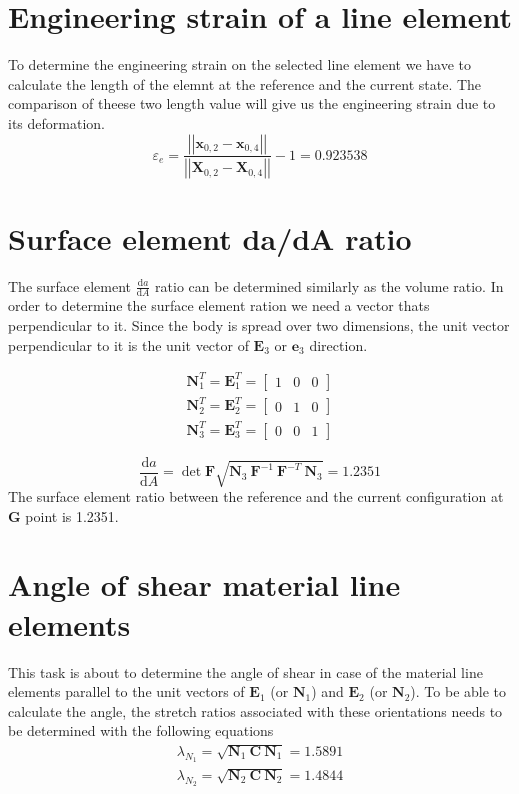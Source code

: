 \documentclass[12pt]{article}
\begin{document}
\section{Engineering strain of a line element}
To determine the engineering strain on the selected line element we have to calculate the length of the elemnt at the reference and the current state. The comparison of theese two length value will give us the engineering strain due to its deformation.
\begin{equation}
  \varepsilon_{e} = \dfrac{\left| \left| \textbf{x}_{0,2} - \textbf{x}_{0,4} \right| \right|}{\left| \left| \textbf{X}_{0,2} - \textbf{X}_{0,4} \right| \right|} -1 = 0.923538
\end{equation}

\section{Surface element da/dA ratio}
The surface element $\frac{\text{d}a}{\text{d}A}$ ratio can be determined similarly as the volume ratio.
In order to determine the surface element ration we need a vector thats perpendicular to it. Since the body is spread over two dimensions, the unit vector perpendicular to it is the unit vector of $\textbf{E}_3$ or $\textbf{e}_3$ direction.

\begin{gather}
  \textbf{N}_1^T = \textbf{E}_1^T = \begin{bmatrix}
    1 & 0 & 0
  \end{bmatrix}\\
  \textbf{N}_2^T = \textbf{E}_2^T = \begin{bmatrix}
    0 & 1 & 0
  \end{bmatrix}\\
  \textbf{N}_3^T = \textbf{E}_3^T = \begin{bmatrix}
    0 & 0 & 1
  \end{bmatrix}
\end{gather}

\begin{equation}
  \frac{\text{d}a}{\text{d}A} = \det \textbf{F} \sqrt{\textbf{N}_3~ \textbf{F}^{-1}~ \textbf{F}^{-T} ~\textbf{N}_3} = 1.2351
\end{equation}
The surface element ratio between the reference and the current configuration at \textbf{G} point is 1.2351.

\section{Angle of shear material line elements}
This task is about to determine the angle of shear in case of the material line elements parallel to the unit vectors of $\textbf{E}_1$ (or $\textbf{N}_1$) and $\textbf{E}_2$ (or $\textbf{N}_2$).
To be able to calculate the angle, the stretch ratios associated with these orientations needs to be determined with the following equations
\begin{gather}
  \lambda_{N_1} = \sqrt{\textbf{N}_1 ~ \textbf{C} ~\textbf{N}_1} = 1.5891\\
  \lambda_{N_2} = \sqrt{\textbf{N}_2 ~ \textbf{C} ~\textbf{N}_2} = 1.4844
\end{gather}
\end{document}
